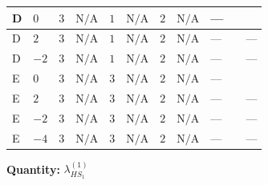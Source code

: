 \documentclass[8pt]{article}
\begin{document}
\begin{landscape}
\begin{longtable}{@{}llcccccc >{\raggedright\arraybackslash}p{0.21\linewidth} >{\raggedright\arraybackslash}p{0.21\linewidth} >{\raggedright\arraybackslash}p{0.21\linewidth}@{}}
\midrule
D & $0$ & $3$ & $\text{N/A}$ & $1$ & $\text{N/A}$ & $2$ & $\text{N/A}$ & --- & \scriptsize\adjustbox{max width=\linewidth}{$\begin{gathered} +4 {\lambda_5} \left({\lambda_5}\right)^{*}\end{gathered}$} & \scriptsize\adjustbox{max width=\linewidth}{$\begin{gathered} +20 {\lambda_{X_{9}}} \left({\lambda_{X_{18}}}\right)^{*}\end{gathered}$} \\
\midrule
D & $2$ & $3$ & $\text{N/A}$ & $1$ & $\text{N/A}$ & $2$ & $\text{N/A}$ & --- & \scriptsize\adjustbox{max width=\linewidth}{$\begin{gathered} +4 {\lambda_5} \left({\lambda_5}\right)^{*}\end{gathered}$} & --- \\
\midrule
D & $-2$ & $3$ & $\text{N/A}$ & $1$ & $\text{N/A}$ & $2$ & $\text{N/A}$ & --- & \scriptsize\adjustbox{max width=\linewidth}{$\begin{gathered} +4 {\lambda_5} \left({\lambda_5}\right)^{*}\end{gathered}$} & --- \\
\midrule
E & $0$ & $3$ & $\text{N/A}$ & $3$ & $\text{N/A}$ & $2$ & $\text{N/A}$ & --- & \scriptsize\adjustbox{max width=\linewidth}{$\begin{gathered} +4 {\lambda_5} \left({\lambda_5}\right)^{*}\end{gathered}$} & \scriptsize\adjustbox{max width=\linewidth}{$\begin{gathered} +20 {\lambda_{X_{9}}} \left({\lambda_{X_{18}}}\right)^{*}\end{gathered}$} \\
\midrule
E & $2$ & $3$ & $\text{N/A}$ & $3$ & $\text{N/A}$ & $2$ & $\text{N/A}$ & --- & \scriptsize\adjustbox{max width=\linewidth}{$\begin{gathered} +4 {\lambda_5} \left({\lambda_5}\right)^{*}\end{gathered}$} & --- \\
\midrule
E & $-2$ & $3$ & $\text{N/A}$ & $3$ & $\text{N/A}$ & $2$ & $\text{N/A}$ & --- & \scriptsize\adjustbox{max width=\linewidth}{$\begin{gathered} +4 {\lambda_5} \left({\lambda_5}\right)^{*}\end{gathered}$} & --- \\
\midrule
E & $-4$ & $3$ & $\text{N/A}$ & $3$ & $\text{N/A}$ & $2$ & $\text{N/A}$ & --- & \scriptsize\adjustbox{max width=\linewidth}{$\begin{gathered} +4 {\lambda_5} \left({\lambda_5}\right)^{*}\end{gathered}$} & --- \\
\midrule
\bottomrule
\end{longtable}
\clearpage
\noindent\textbf{Quantity: }$\lambda_{HS_1}^{(1)}$\par\smallskip

\end{landscape}
\end{document}
